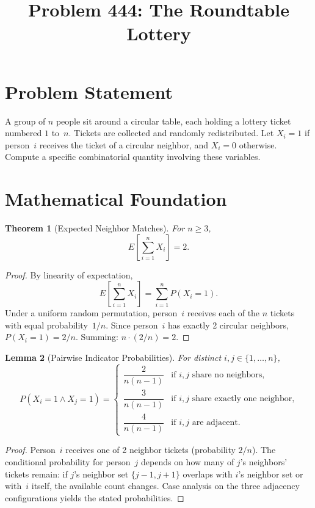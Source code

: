 \documentclass[12pt]{article}
\title{Problem 444: The Roundtable Lottery}
\author{}
\date{}
\newtheorem{theorem}{Theorem}
\newtheorem{lemma}[theorem]{Lemma}
\begin{document}
\maketitle

\section{Problem Statement}
A group of $n$ people sit around a circular table, each holding a lottery ticket numbered $1$ to~$n$. Tickets are collected and randomly redistributed. Let $X_i = 1$ if person~$i$ receives the ticket of a circular neighbor, and $X_i = 0$ otherwise. Compute a specific combinatorial quantity involving these variables.

\section{Mathematical Foundation}

\begin{theorem}[Expected Neighbor Matches]
For $n \geq 3$,
\[
E\!\left[\sum_{i=1}^{n} X_i\right] = 2.
\]
\end{theorem}

\begin{proof}
By linearity of expectation,
\[
E\!\left[\sum_{i=1}^{n} X_i\right] = \sum_{i=1}^{n} P(X_i = 1).
\]
Under a uniform random permutation, person~$i$ receives each of the $n$ tickets with equal probability~$1/n$. Since person~$i$ has exactly 2 circular neighbors, $P(X_i = 1) = 2/n$. Summing: $n \cdot (2/n) = 2$.
\end{proof}

\begin{lemma}[Pairwise Indicator Probabilities]
For distinct $i, j \in \{1, \ldots, n\}$,
\[
P(X_i = 1 \wedge X_j = 1) = \begin{cases}
\dfrac{2}{n(n-1)} & \text{if } i,j \text{ share no neighbors,}\\[6pt]
\dfrac{3}{n(n-1)} & \text{if } i,j \text{ share exactly one neighbor,}\\[6pt]
\dfrac{4}{n(n-1)} & \text{if } i,j \text{ are adjacent.}
\end{cases}
\]
\end{lemma}

\begin{proof}
Person~$i$ receives one of 2 neighbor tickets (probability $2/n$). The conditional probability for person~$j$ depends on how many of $j$'s neighbors' tickets remain: if $j$'s neighbor set $\{j-1,j+1\}$ overlaps with $i$'s neighbor set or with~$i$ itself, the available count changes. Case analysis on the three adjacency configurations yields the stated probabilities.
\end{proof}
\end{document}
